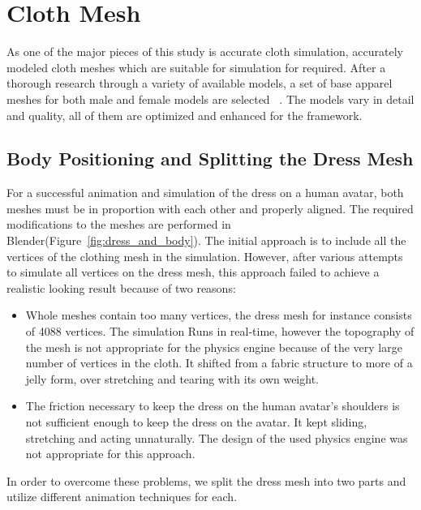 \section{Cloth Mesh}
\label{section_cloth_mesh}

As one of the major pieces of this study is accurate cloth simulation, accurately modeled cloth meshes which are suitable for simulation for required. After a thorough research through a variety of available models, a set of base apparel meshes for both male and female models are selected ~\cite{LadyJewell2012, 3dregenerator2013,Axel2013,Borodin2013,PS3D2013,Alperin2013}. The models vary in detail and quality, all of them are optimized and enhanced for the framework. 

\subsection{Body Positioning and Splitting the Dress Mesh}

For a successful animation and simulation of the dress on a human avatar, both meshes must be in proportion with each other and properly aligned. The required modifications to the meshes are performed in Blender(Figure~\ref{fig:dress_and_body}). The initial approach is to include all the vertices of the clothing mesh in the simulation. However, after various attempts to simulate all vertices on the dress mesh, this approach failed to achieve a realistic looking result because of two reasons:
\begin{itemize}
\item Whole meshes contain too many vertices, the dress mesh for instance consists of 4088 vertices. The simulation Runs in real-time, however the topography of the mesh is not appropriate for the physics engine because of the very large number of vertices in the cloth. It shifted from a fabric structure to more of a jelly form, over stretching and tearing with its own weight.
\item The friction necessary to keep the dress on the human avatar's shoulders is not sufficient enough to keep the dress on the avatar. It kept sliding, stretching and acting unnaturally. The design of the used physics engine was not appropriate for this approach.
\end{itemize}

In order to overcome these problems, we split the dress mesh into two parts and utilize different animation techniques for each.

